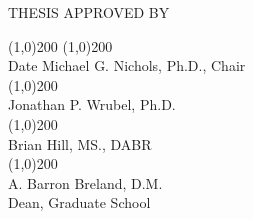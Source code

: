 \begin{titlepage}

	\begin{center}

		THESIS APPROVED BY\\
		\vspace{1.5cm}
    \end{center}
		\line(1,0){200} \hspace{2cm} \line(1,0){200} \\	
		Date \hspace{8cm} Michael G. Nichols, Ph.D., Chair
		\vspace{1.5cm}\\
        \null \hspace{9cm} \line(1,0){200} \\	
		\null \hspace{9cm} Jonathan P. Wrubel, Ph.D.
        \vspace{1.5cm}\\
		\null \hspace{9cm} \line(1,0){200} \\	
		\null \hspace{9cm} Brian Hill, MS., DABR
        \vspace{2.5cm}\\
		\null \hspace{9cm} \line(1,0){200} \\	
		\null \hspace{9cm} A. Barron Breland, D.M. \\
		\null \hspace{9cm} Dean, Graduate School
	

\end{titlepage}